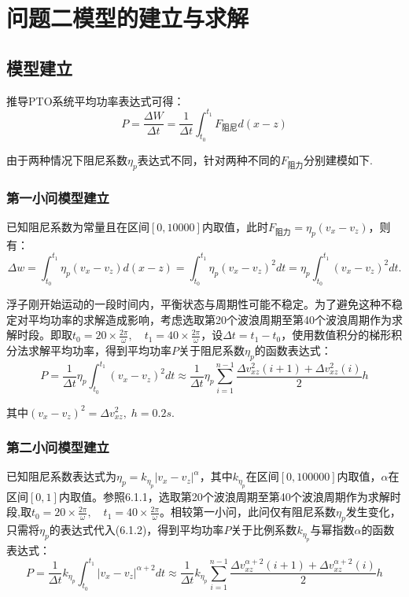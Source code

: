 \documentclass{article}
\numberwithin{equation}{subsection}
\begin{document}
{\centering\section{问题二模型的建立与求解}}

\subsection{模型建立}
推导PTO系统平均功率表达式可得：
$$
P=\frac{\Delta W}{\Delta t}=\frac{1}{\Delta t} \int_{t_{0}}^{t_{1}} F_{\text{阻尼}} d(x-z)
$$

由于两种情况下阻尼系数$\eta _p$表达式不同，针对两种不同的$F_{\text{阻力}}$分别建模如下.

\subsubsection{第一小问模型建立}
已知阻尼系数为常量且在区间$[0,10000]$内取值，此时$F_{\text{阻力}}=\eta_{p}\left(v_{x}-v_{z}\right)$，则有：
\begin{equation}
\Delta w=\int_{t_{0}}^{t_{1}} \eta_{p}\left(v_{x}-v_{z}\right) d(x-z) =\int_{t_{0}}^{t_{1}} \eta_{p}\left(v_{x}-v_{z}\right)^{2} d t =\eta_{p} \int_{t_{0}}^{t_{1}}\left(v_{x}-v_{z}\right)^{2} d t .
\end{equation}

浮子刚开始运动的一段时间内，平衡状态与周期性可能不稳定。为了避免这种不稳定对平均功率的求解造成影响，考虑选取第20个波浪周期至第40个波浪周期作为求解时段。即取$ t_{0}=20 \times \frac{2 \pi}{\omega}, \quad t_{1}=40 \times \frac{2 \pi}{\omega}$，设$\Delta t=t_1-t_0$，使用数值积分的梯形积分法求解平均功率，得到平均功率$P$关于阻尼系数$\eta _{p}$的函数表达式：
\begin{equation}
P=\frac{1}{\Delta t} \eta_{p}\int_{t_0}^{t_{1}}\left(v_{x}-v_{z}\right)^{2} d t \approx \frac{1}{\Delta t} \eta_{p}\sum\limits_{i=1}^{n-1} \frac{\Delta v_{x z}^{2}(i+1)+\Delta v_{x z}^{2}(i)}{2} h
\end{equation}

其中$\left(v_{x}-v_{z}\right)^{2}=\Delta v_{x z}^{2},\; h=0.2s $.

\subsubsection{第二小问模型建立}
已知阻尼系数表达式为$\eta _{p}=k_{\eta _{p}}|{v_x}-{v_z}|^{\alpha}$，其中$k_{\eta _{p}}$在区间$[0,100000]$内取值，$\alpha$在区间$[0,1]$内取值。参照6.1.1，选取第20个波浪周期至第40个波浪周期作为求解时段,取$ t_{0}=20 \times \frac{2 \pi}{\omega}, \quad t_{1}=40 \times \frac{2 \pi}{\omega}$。相较第一小问，此问仅有阻尼系数$\eta_p$发生变化，只需将$\eta_p$的表达式代入(6.1.2)，得到平均功率$P$关于比例系数$k_{\eta_{p}}$与幂指数$\alpha$的函数表达式：
\begin{equation}
    P=\frac{1}{\Delta t} k_{\eta _{p}}\int_{t_0}^{t_{1}}|{v_x}-{v_z}|^{\alpha+2} d t \approx \frac{1}{\Delta t} k_{\eta _{p}} \sum\limits_{i=1}^{n-1} \frac{\Delta v_{x z}^{\alpha+2}(i+1)+\Delta v_{x z}^{\alpha+2}(i)}{2} h
\end{equation}
    
\end{document}
